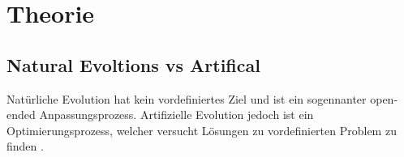 %
%


\chapter{Theorie}
\lipsum[6] \cite{IEEEexample:article_typical}
\lipsum[7] \cite{mirrorcle_userguide}
\section{Natural Evoltions vs Artifical}
  Natürliche Evolution hat kein vordefiniertes Ziel und ist ein sogennanter open-ended Anpassungsprozess. Artifizielle Evolution jedoch ist ein Optimierungsprozess, welcher versucht Lösungen zu vordefinierten Problem zu finden \cite[S.1]{book:bioInspired}. \\

